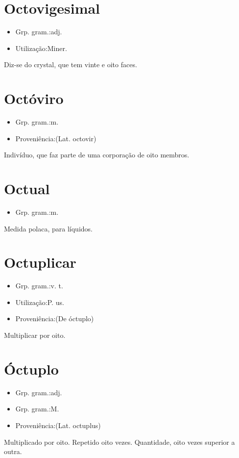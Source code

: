 \section{Octovigesimal}
\begin{itemize}
\item {Grp. gram.:adj.}
\end{itemize}
\begin{itemize}
\item {Utilização:Miner.}
\end{itemize}
Diz-se do crystal, que tem vinte e oito faces.
\section{Octóviro}
\begin{itemize}
\item {Grp. gram.:m.}
\end{itemize}
\begin{itemize}
\item {Proveniência:(Lat. \textunderscore octovir\textunderscore )}
\end{itemize}
Indivíduo, que faz parte de uma corporação de oito membros.
\section{Octual}
\begin{itemize}
\item {Grp. gram.:m.}
\end{itemize}
Medida polaca, para líquidos.
\section{Octuplicar}
\begin{itemize}
\item {Grp. gram.:v. t.}
\end{itemize}
\begin{itemize}
\item {Utilização:P. us.}
\end{itemize}
\begin{itemize}
\item {Proveniência:(De \textunderscore óctuplo\textunderscore )}
\end{itemize}
Multiplicar por oito.
\section{Óctuplo}
\begin{itemize}
\item {Grp. gram.:adj.}
\end{itemize}
\begin{itemize}
\item {Grp. gram.:M.}
\end{itemize}
\begin{itemize}
\item {Proveniência:(Lat. \textunderscore octuplus\textunderscore )}
\end{itemize}
Multiplicado por oito.
Repetido oito vezes.
Quantidade, oito vezes superior a outra.
